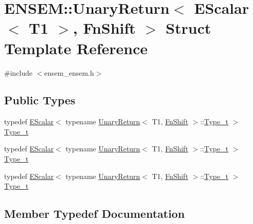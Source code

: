 \hypertarget{structENSEM_1_1UnaryReturn_3_01EScalar_3_01T1_01_4_00_01FnShift_01_4}{}\section{E\+N\+S\+EM\+:\+:Unary\+Return$<$ E\+Scalar$<$ T1 $>$, Fn\+Shift $>$ Struct Template Reference}
\label{structENSEM_1_1UnaryReturn_3_01EScalar_3_01T1_01_4_00_01FnShift_01_4}


{\ttfamily \#include $<$ensem\+\_\+ensem.\+h$>$}

\subsection*{Public Types}
\begin{DoxyCompactItemize}
\item 
typedef \mbox{\hyperlink{classENSEM_1_1EScalar}{E\+Scalar}}$<$ typename \mbox{\hyperlink{structENSEM_1_1UnaryReturn}{Unary\+Return}}$<$ T1, \mbox{\hyperlink{structENSEM_1_1FnShift}{Fn\+Shift}} $>$\+::\mbox{\hyperlink{structENSEM_1_1UnaryReturn_3_01EScalar_3_01T1_01_4_00_01FnShift_01_4_a36d8927b4e6f9ea44292d01926dc292a}{Type\+\_\+t}} $>$ \mbox{\hyperlink{structENSEM_1_1UnaryReturn_3_01EScalar_3_01T1_01_4_00_01FnShift_01_4_a36d8927b4e6f9ea44292d01926dc292a}{Type\+\_\+t}}
\item 
typedef \mbox{\hyperlink{classENSEM_1_1EScalar}{E\+Scalar}}$<$ typename \mbox{\hyperlink{structENSEM_1_1UnaryReturn}{Unary\+Return}}$<$ T1, \mbox{\hyperlink{structENSEM_1_1FnShift}{Fn\+Shift}} $>$\+::\mbox{\hyperlink{structENSEM_1_1UnaryReturn_3_01EScalar_3_01T1_01_4_00_01FnShift_01_4_a36d8927b4e6f9ea44292d01926dc292a}{Type\+\_\+t}} $>$ \mbox{\hyperlink{structENSEM_1_1UnaryReturn_3_01EScalar_3_01T1_01_4_00_01FnShift_01_4_a36d8927b4e6f9ea44292d01926dc292a}{Type\+\_\+t}}
\item 
typedef \mbox{\hyperlink{classENSEM_1_1EScalar}{E\+Scalar}}$<$ typename \mbox{\hyperlink{structENSEM_1_1UnaryReturn}{Unary\+Return}}$<$ T1, \mbox{\hyperlink{structENSEM_1_1FnShift}{Fn\+Shift}} $>$\+::\mbox{\hyperlink{structENSEM_1_1UnaryReturn_3_01EScalar_3_01T1_01_4_00_01FnShift_01_4_a36d8927b4e6f9ea44292d01926dc292a}{Type\+\_\+t}} $>$ \mbox{\hyperlink{structENSEM_1_1UnaryReturn_3_01EScalar_3_01T1_01_4_00_01FnShift_01_4_a36d8927b4e6f9ea44292d01926dc292a}{Type\+\_\+t}}
\end{DoxyCompactItemize}


\subsection{Member Typedef Documentation}
\mbox{\label{structENSEM_1_1UnaryReturn_3_01EScalar_3_01T1_01_4_00_01FnShift_01_4_a36d8927b4e6f9ea44292d01926dc292a}} 

